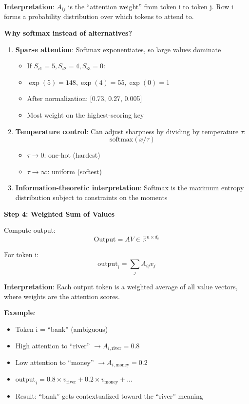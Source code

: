 \textbf{Interpretation}: $A_{ij}$ is the ``attention weight'' from token i to token j. Row i forms a probability distribution over which tokens to attend to.

\textbf{Why softmax instead of alternatives?}

\begin{enumerate}
\item \textbf{Sparse attention}: Softmax exponentiates, so large values dominate
\begin{itemize}
\item If $S_{i1} = 5, S_{i2} = 4, S_{i3} = 0$:
\item $\exp(5) = 148, \exp(4) = 55, \exp(0) = 1$
\item After normalization: [0.73, 0.27, 0.005]
\item Most weight on the highest-scoring key
\end{itemize}

\item \textbf{Temperature control}: Can adjust sharpness by dividing by temperature $\tau$:
\[
\text{softmax}(x/\tau)
\]
\begin{itemize}
\item $\tau \to 0$: one-hot (hardest)
\item $\tau \to \infty$: uniform (softest)
\end{itemize}

\item \textbf{Information-theoretic interpretation}: Softmax is the maximum entropy distribution subject to constraints on the moments
\end{enumerate}

\textbf{Step 4: Weighted Sum of Values}

Compute output:
\[
\text{Output} = AV \in \mathbb{R}^{n \times d_v}
\]

For token i:
\[
\text{output}_i = \sum_j A_{ij} v_j
\]

\textbf{Interpretation}: Each output token is a weighted average of all value vectors, where weights are the attention scores.

\textbf{Example}:
\begin{itemize}
\item Token i = ``bank'' (ambiguous)
\item High attention to ``river'' $\to A_{i,\text{river}} = 0.8$
\item Low attention to ``money'' $\to A_{i,\text{money}} = 0.2$
\item $\text{output}_i = 0.8 \times v_{\text{river}} + 0.2 \times v_{\text{money}} + ...$
\item Result: ``bank'' gets contextualized toward the ``river'' meaning
\end{itemize}

